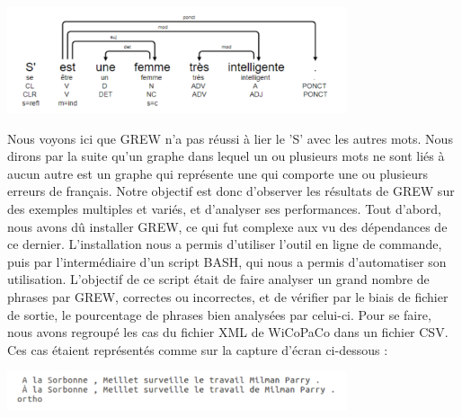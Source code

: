 \documentclass[11pt]{article}
\begin{document}
\begin{center}
\includegraphics[width=10cm]{imgGrew.png} %
\end{center}

Nous voyons ici que GREW n'a pas r\'{e}ussi \`{a} lier le 'S' avec les autres mots. Nous dirons par la suite qu'un graphe dans lequel un ou plusieurs mots ne sont li\'{e}s \`{a} aucun autre est un graphe qui repr\'{e}sente une qui comporte une ou plusieurs erreurs de fran\c{c}ais. Notre objectif est donc d'observer  les r\'{e}sultats de GREW sur des exemples multiples et vari\'{e}s, et d'analyser ses performances.
\newline
\newline
Tout d'abord, nous avons d\^{u} installer GREW, ce qui fut complexe aux vu des d\'{e}pendances de ce dernier. L'installation nous a permis d'utiliser l'outil en ligne de commande, puis par l'interm\'{e}diaire d'un script BASH, qui nous a permis d'automatiser son utilisation. L'objectif de ce script \'{e}tait de faire analyser un grand nombre de phrases par GREW, correctes ou incorrectes, et de v\'{e}rifier par le biais de fichier de sortie, le pourcentage de phrases bien analys\'{e}es par celui-ci. Pour se faire, nous avons regroup\'{e} les cas du fichier XML de WiCoPaCo dans un fichier CSV. Ces cas \'{e}taient repr\'{e}sent\'{e}s comme sur la capture d'\'{e}cran ci-dessous :

\begin{center}
\includegraphics[width=10cm]{exemple1.png} %
\end{center}
\end{document}
